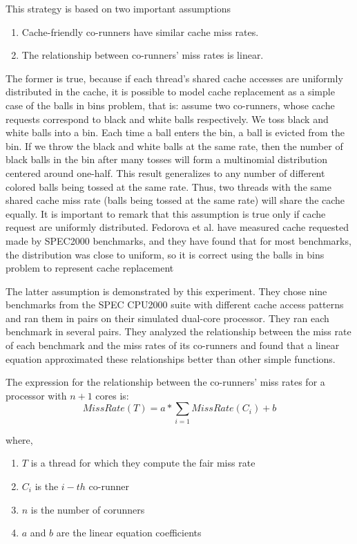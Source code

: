 This strategy is based on two important assumptions 
\begin {enumerate}
	\item Cache-friendly co-runners have similar cache miss rates.
	\item The relationship between co-runners' miss rates is linear.
\end{enumerate}

The former is true, because if each thread's shared cache accesses are uniformly distributed in the cache, it is possible to model cache 
replacement as a simple case of the balls in bins problem, that is: assume two co-runners, whose cache requests correspond to black and white balls 
respectively. We toss black and white balls into a bin. Each time a ball enters the bin, a ball is evicted from the bin. 
If we throw the black and white balls at the same rate, then the number of black balls in the bin after many tosses will form a
multinomial distribution centered around one-half. This result generalizes to any number of different colored balls being tossed at
the same rate. Thus, two threads with the same shared cache miss rate (balls being tossed at the same rate) will share the cache equally.
It is important to remark that this assumption is true only if cache request are uniformly distributed. Fedorova et al. have measured cache requested
made by SPEC2000 benchmarks, and they have found that for most benchmarks, the distribution was close to uniform, so it is correct using the balls in bins
problem to represent cache replacement

The latter assumption is demonstrated by this experiment.
They chose nine benchmarks from the SPEC CPU2000 suite with different cache access patterns and ran them in pairs on their simulated dual-core processor.
They ran each benchmark in several pairs. They analyzed the relationship between the miss rate of each benchmark and the miss rates of its co-runners and 
found that a linear equation approximated these relationships better than other simple functions.

The expression for the relationship between the co-runners' miss rates for a processor with $n+1$ cores is:
\begin{equation}
	MissRate(T) = a*\sum_{i=1} MissRate(C_{i}) + b
\label{eq:miss_rate}
\end{equation}

where,
\begin{enumerate}
	\item $T$ is a thread for which they compute the fair miss rate
	\item $C_i$ is the $i-th$ co-runner
	\item $n$ is the number of corunners
	\item $a$ and $b$ are the linear equation coefficients
\end{enumerate}

